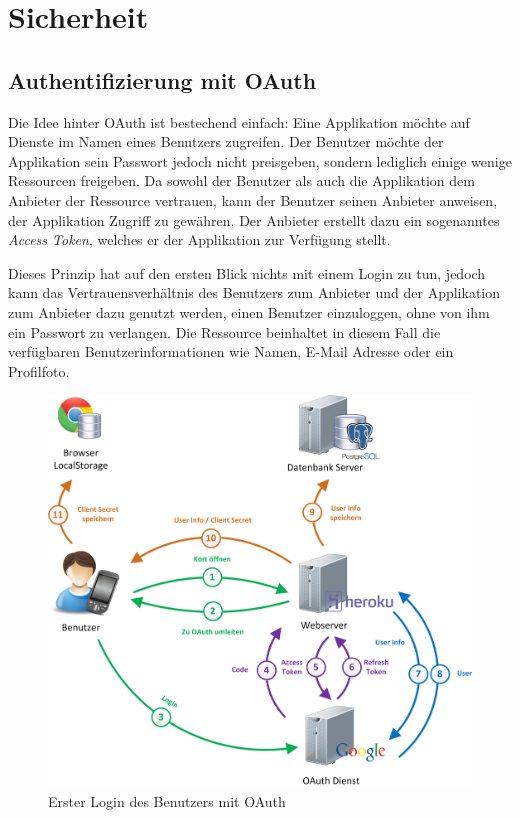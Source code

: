 \section{Sicherheit}
\subsection{Authentifizierung mit OAuth}
\label{oauth}

Die Idee hinter \gls{OAuth} ist bestechend einfach: Eine Applikation möchte auf Dienste im Namen eines Benutzers zugreifen.
Der Benutzer möchte der Applikation sein Passwort jedoch nicht preisgeben, sondern lediglich einige wenige Ressourcen freigeben.
Da sowohl der Benutzer als auch die Applikation dem Anbieter der Ressource vertrauen, kann der Benutzer seinen Anbieter anweisen, der Applikation Zugriff zu gewähren.
Der Anbieter erstellt dazu ein sogenanntes \emph{Access Token}, welches er der Applikation zur Verfügung stellt.

Dieses Prinzip hat auf den ersten Blick nichts mit einem Login zu tun, jedoch kann das Vertrauensverhältnis des Benutzers zum Anbieter und der Applikation zum Anbieter dazu genutzt werden, einen Benutzer einzuloggen, ohne von ihm ein Passwort zu verlangen. 
Die Ressource beinhaltet in diesem Fall die verfügbaren Benutzerinformationen wie Namen, E-Mail Adresse oder ein Profilfoto.

\begin{figure}[H]
	\centering
	\includegraphics[scale=0.4]{images/implementation/backend/kort-login}
	\caption{Erster Login des Benutzers mit OAuth}
	\label{image-kort-login}
\end{figure}

